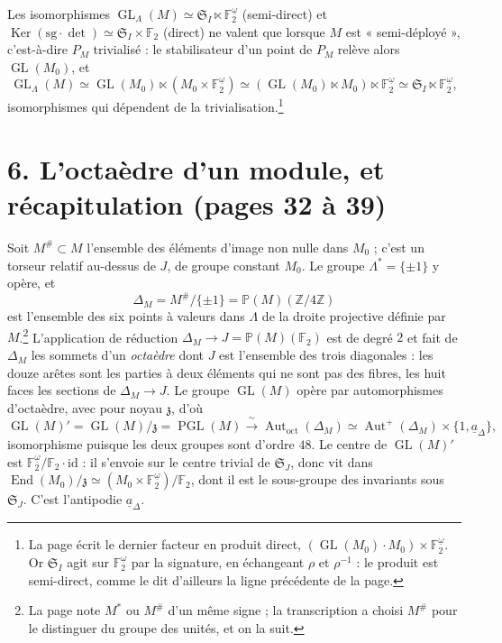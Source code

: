 \documentclass[11pt,a4paper]{article}
\begin{document}
Les isomorphismes $\operatorname{GL}_\Lambda(M) \simeq \mathfrak{S}_I \ltimes
\mathbb{F}_2^{\underline{\omega}}$ (semi-direct) et
$\operatorname{Ker}(\mathrm{sg} \cdot \det) \simeq \mathfrak{S}_I \times
\mathbb{F}_2$ (direct) ne valent que lorsque $M$ est « semi-déployé »,
c'est-à-dire $P_M$ trivialisé : le stabilisateur d'un point de $P_M$ relève
alors $\operatorname{GL}(M_0)$, et
\[
\operatorname{GL}_\Lambda(M) \simeq \operatorname{GL}(M_0) \ltimes (M_0 \times
\mathbb{F}_2^{\underline{\omega}}) \simeq (\operatorname{GL}(M_0) \ltimes M_0)
\ltimes \mathbb{F}_2^{\underline{\omega}} \simeq \mathfrak{S}_I \ltimes
\mathbb{F}_2^{\underline{\omega}},
\]
isomorphismes qui dépendent de la trivialisation.\footnote{La page écrit le
dernier facteur en produit direct,
$(\operatorname{GL}(M_0) \cdot M_0) \times \mathbb{F}_2^{\underline{\omega}}$.
Or $\mathfrak{S}_I$ agit sur $\mathbb{F}_2^{\underline{\omega}}$ par la
signature, en échangeant $\rho$ et $\rho^{-1}$ : le produit est semi-direct,
comme le dit d'ailleurs la ligne précédente de la page.}

\section*{6. L'octaèdre d'un module, et récapitulation (pages 32 à 39)}

Soit $M^{\#} \subset M$ l'ensemble des éléments d'image non nulle dans $M_0$ ;
c'est un torseur relatif au-dessus de $J$, de groupe constant $M_0$. Le groupe
$\Lambda^{*} = \{\pm 1\}$ y opère, et
\[
\Delta_M = M^{\#}/\{\pm 1\} = \mathbb{P}(M)(\mathbb{Z}/4\mathbb{Z})
\]
est l'ensemble des six points à valeurs dans $\Lambda$ de la droite projective
définie par $M$.\footnote{La page note $M^{*}$ ou $M^{\#}$ d'un même signe ; la
transcription a choisi $M^{\#}$ pour le distinguer du groupe des unités, et on
la suit.} L'application de réduction $\Delta_M \to J =
\mathbb{P}(M)(\mathbb{F}_2)$ est de degré $2$ et fait de $\Delta_M$ les sommets
d'un \emph{octaèdre} dont $J$ est l'ensemble des trois diagonales : les douze
arêtes sont les parties à deux éléments qui ne sont pas des fibres, les huit
faces les sections de $\Delta_M \to J$. Le groupe $\operatorname{GL}(M)$ opère
par automorphismes d'octaèdre, avec pour noyau $\mathfrak{z}$, d'où
\[
\operatorname{GL}(M)' = \operatorname{GL}(M)/\mathfrak{z} = \operatorname{PGL}(M)
\xrightarrow{\;\sim\;} \operatorname{Aut}_{\mathrm{oct}}(\Delta_M) \simeq
\operatorname{Aut}^{+}(\Delta_M) \times \{1, \underline{a}_\Delta\},
\]
isomorphisme puisque les deux groupes sont d'ordre $48$. Le centre de
$\operatorname{GL}(M)'$ est $\mathbb{F}_2^{\underline{\omega}} / \mathbb{F}_2
\cdot \mathrm{id}$ : il s'envoie sur le centre trivial de $\mathfrak{S}_J$, donc
vit dans $\operatorname{End}(M_0)/\mathfrak{z} \simeq (M_0 \times
\mathbb{F}_2^{\underline{\omega}})/\mathbb{F}_2$, dont il est le sous-groupe des
invariants sous $\mathfrak{S}_J$. C'est l'antipodie $\underline{a}_\Delta$.
\end{document}
